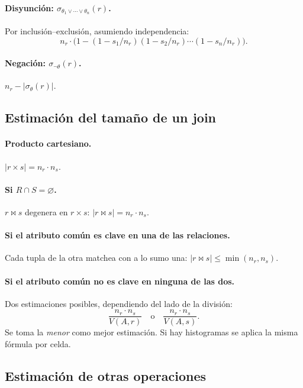 \documentclass[11pt,a4paper]{article}
\newcommand{\sel}[1]{\sigma_{#1}}
\newcommand{\jn}{\bowtie}
\begin{document}
\paragraph{Disyunción: $\sel{\theta_1\vee\cdots\vee\theta_n}(r)$.}
Por inclusión--exclusión, asumiendo independencia:
\[
n_r \cdot \big(1 - (1 - s_1/n_r)(1 - s_2/n_r)\cdots(1 - s_n/n_r)\big).
\]

\paragraph{Negación: $\sel{\neg\theta}(r)$.}
$n_r - |\sel{\theta}(r)|$.

\subsection{Estimación del tamaño de un join}

\paragraph{Producto cartesiano.}
$|r\times s| = n_r \cdot n_s$.

\paragraph{Si $R \cap S = \varnothing$.}
$r \jn s$ degenera en $r \times s$: $|r\jn s| = n_r \cdot n_s$.

\paragraph{Si el atributo común es clave en una de las relaciones.}
Cada tupla de la otra matchea con a lo sumo una:
$|r \jn s| \le \min(n_r, n_s)$.

\paragraph{Si el atributo común no es clave en ninguna de las dos.}
Dos estimaciones posibles, dependiendo del lado de la división:
\[
\frac{n_r \cdot n_s}{V(A,r)} \quad\text{o}\quad \frac{n_r \cdot n_s}{V(A,s)} .
\]
Se toma la \emph{menor} como mejor estimación. Si hay histogramas se aplica
la misma fórmula por celda.

\subsection{Estimación de otras operaciones}
\end{document}
